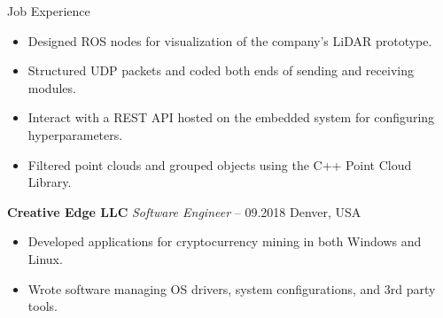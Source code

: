 \begin{rubric}{Job Experience}
\begin{itemize}
	\setlength{\itemsep}{\CVItemizeSpacing}
	\item Designed ROS nodes for visualization of the company's LiDAR prototype.  
	\item Structured UDP packets and coded both ends of sending and receiving modules.
	\item Interact with a REST API hosted on the embedded system for configuring hyperparameters.
	\item Filtered point clouds and grouped objects using the C++ Point Cloud Library.  
\end{itemize}
%
%
\entry*[] \textbf{Creative Edge LLC} \hfill \textit{Software Engineer}  -- 09.2018 \hfill Denver, USA \newline
\vspace{\CVItemizeHeaderSpacing} \begin{itemize} %
	\setlength{\itemsep}{\CVItemizeSpacing}
	\item Developed applications for cryptocurrency mining in both Windows and Linux.  
	\item Wrote software managing OS drivers, system configurations, and 3rd party tools.
\end{itemize}

\end{rubric}
